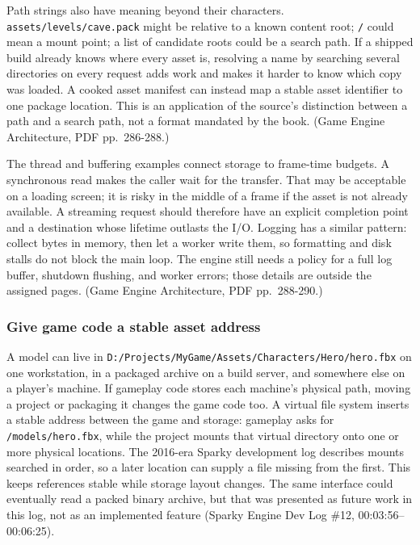 Path strings also have meaning beyond their characters. \texttt{assets/levels/cave.pack} might be relative to a known content root; \texttt{/} could mean a mount point; a list of candidate roots could be a search path. If a shipped build already knows where every asset is, resolving a name by searching several directories on every request adds work and makes it harder to know which copy was loaded. A cooked asset manifest can instead map a stable asset identifier to one package location. This is an application of the source's distinction between a path and a search path, not a format mandated by the book. (Game Engine Architecture, PDF pp.~286-288.)

The thread and buffering examples connect storage to frame-time budgets. A synchronous read makes the caller wait for the transfer. That may be acceptable on a loading screen; it is risky in the middle of a frame if the asset is not already available. A streaming request should therefore have an explicit completion point and a destination whose lifetime outlasts the I/O. Logging has a similar pattern: collect bytes in memory, then let a worker write them, so formatting and disk stalls do not block the main loop. The engine still needs a policy for a full log buffer, shutdown flushing, and worker errors; those details are outside the assigned pages. (Game Engine Architecture, PDF pp.~288-290.)

\subsubsection{Give game code a stable asset address}\label{06-engine-ii-ch027-give-game-code-a-stable-asset-address}

\hypertarget{06-engine-ii-ch027-give-game-code-a-stable-asset-address}{}

A model can live in \texttt{D:/Projects/MyGame/Assets/Characters/Hero/hero.fbx} on one workstation, in a packaged archive on a build server, and somewhere else on a player's machine. If gameplay code stores each machine's physical path, moving a project or packaging it changes the game code too. A virtual file system inserts a stable address between the game and storage: gameplay asks for \texttt{/models/hero.fbx}, while the project mounts that virtual directory onto one or more physical locations. The 2016-era Sparky development log describes mounts searched in order, so a later location can supply a file missing from the first. This keeps references stable while storage layout changes. The same interface could eventually read a packed binary archive, but that was presented as future work in this log, not as an implemented feature (Sparky Engine Dev Log \#12, 00:03:56--00:06:25).

